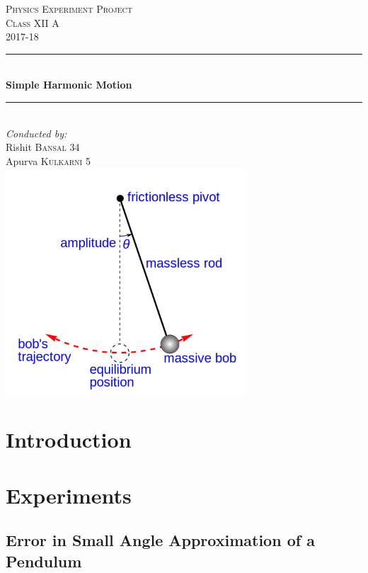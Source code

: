 \documentclass[12pt]{report}
\numberwithin{equation}{section}
\begin{document}
\begin{titlepage}
  
\newcommand{\HRule}{\rule{\linewidth}{0.5mm}}

\center
\vspace*{3cm} 

\textsc{\LARGE Physics Experiment Project}\\[1.5cm]
\textsc{\Large Class XII A}\\[0.5cm]
\textsc{\large 2017-18}\\[0.5cm]


\HRule \\[0.4cm]
{ \huge \bfseries Simple Harmonic Motion}\\[0.4cm]
\HRule \\[1.5cm]
 

\Large \emph{Conducted by:}\\
\large Rishit \textsc{Bansal 34}\\
\large Apurva \textsc{Kulkarni 5}\\[2cm]

\includegraphics[width=9cm]{title2}
\vfill

\end{titlepage}

\tableofcontents
\chapter{Introduction}


\chapter{Experiments}
\section{Error in Small Angle Approximation of a Pendulum}

\end{document}
